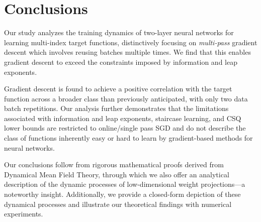 \section{Conclusions}
\label{2402:sec:main:conclusion}
Our study analyzes the training dynamics of two-layer neural networks for learning multi-index target functions, distinctively focusing on {\it multi-pass} gradient descent which involves reusing batches multiple times. We find that this enables gradient descent to exceed the constraints imposed by information and leap exponents. 

Gradient descent is found to achieve a positive correlation with the target function across a broader class than previously anticipated, with only two data batch repetitions. Our analysis further demonstrates that the limitations associated with information and leap exponents, staircase learning, and CSQ lower bounds are restricted to online/single pass SGD and do not describe the class of functions inherently easy or hard to learn by gradient-based methods for neural networks. 

Our conclusions follow from rigorous mathematical proofs derived from Dynamical Mean Field Theory, through which we also offer an analytical description of the dynamic processes of low-dimensional weight projections—a noteworthy insight. Additionally, we provide a closed-form depiction of these dynamical processes and illustrate our theoretical findings with numerical experiments.
